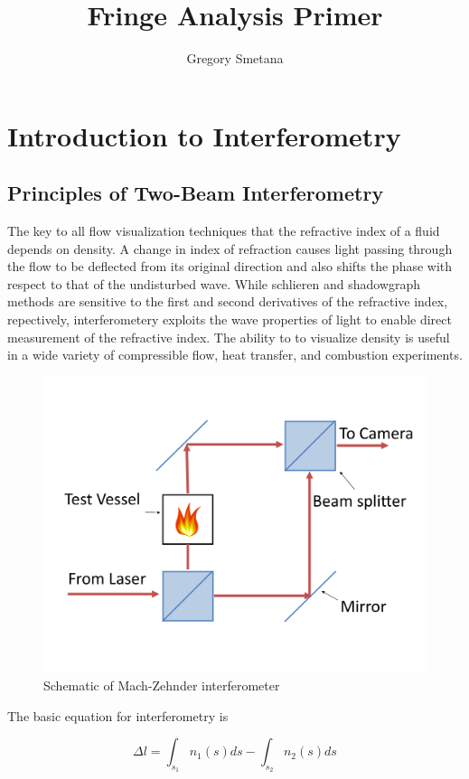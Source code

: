 \documentclass[11pt]{article} %
\title{Fringe Analysis Primer}
\author{Gregory Smetana}
\begin{document}
\maketitle

\section{Introduction to Interferometry}

\subsection{Principles of Two-Beam Interferometry}

The key to all flow visualization techniques that the refractive index of a fluid depends on density. A change in index of refraction causes light passing through the flow to be deflected from its original direction and also shifts the phase with respect to that of the undisturbed wave. While schlieren and shadowgraph methods are sensitive to the first and second derivatives of the refractive index, repectively, interferometery exploits the wave properties of light to enable direct measurement of the refractive index. The ability to to visualize density is useful in a wide variety of compressible flow, heat transfer, and combustion experiments. 

\begin{figure}
	\centering
	\includegraphics[width=0.5\linewidth]{fig/machZehnder}
	\caption{Schematic of Mach-Zehnder interferometer}
	\label{fig:machZehnder}
\end{figure}




The basic equation for interferometry is

\begin{equation}
	\Delta l = \int_{s_1} n_1(s) ds - \int_{s_2} n_2(s) ds  %
	\label{eq:interferometry}
\end{equation}
\end{document}
